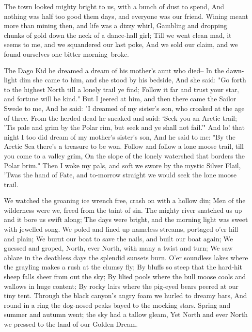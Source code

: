\begin{poemblock}
 The town looked mighty bright to us, with a bunch of dust to spend,
 And nothing was half too good them days, and everyone was our friend.
 Wining meant more than mining then, and life was a dizzy whirl,
 Gambling and dropping chunks of gold down the neck of a dance-hall girl;
 Till we went clean mad, it seems to me, and we squandered our last poke,
 And we sold our claim, and we found ourselves one bitter morning--broke.

 The Dago Kid he dreamed a dream of his mother's aunt who died--
 In the dawn-light dim she came to him, and she stood by his bedside,
 And she said:  "Go forth to the highest North till a lonely trail ye find;
 Follow it far and trust your star, and fortune will be kind."
 But I jeered at him, and then there came the Sailor Swede to me,
 And he said:  "I dreamed of my sister's son,
   who croaked at the age of three.
 From the herded dead he sneaked and said:  `Seek you an Arctic trail;
 'Tis pale and grim by the Polar rim, but seek and ye shall not fail.'"
 And lo! that night I too did dream of my mother's sister's son,
 And he said to me:  "By the Arctic Sea there's a treasure to be won.
 Follow and follow a lone moose trail, till you come to a valley grim,
 On the slope of the lonely watershed that borders the Polar brim."
 Then I woke my pals, and soft we swore by the mystic Silver Flail,
 'Twas the hand of Fate, and to-morrow straight
   we would seek the lone moose trail.

 We watched the groaning ice wrench free, crash on with a hollow din;
 Men of the wilderness were we, freed from the taint of sin.
 The mighty river snatched us up and it bore us swift along;
 The days were bright, and the morning light was sweet with jewelled song.
 We poled and lined up nameless streams, portaged o'er hill and plain;
 We burnt our boat to save the nails, and built our boat again;
 We guessed and groped, North, ever North, with many a twist and turn;
 We saw ablaze in the deathless days the splendid sunsets burn.
 O'er soundless lakes where the grayling makes a rush at the clumsy fly;
 By bluffs so steep that the hard-hit sheep falls sheer from out the sky;
 By lilied pools where the bull moose cools and wallows in huge content;
 By rocky lairs where the pig-eyed bears peered at our tiny tent.
 Through the black canyon's angry foam we hurled to dreamy bars,
 And round in a ring the dog-nosed peaks bayed to the mocking stars.
 Spring and summer and autumn went; the sky had a tallow gleam,
 Yet North and ever North we pressed to the land of our Golden Dream.


\end{poemblock}
